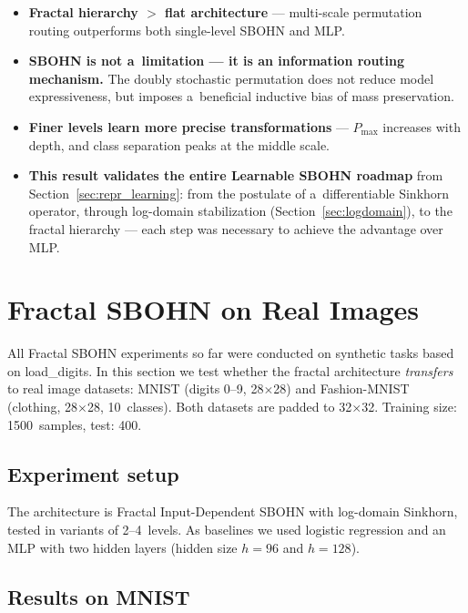 \documentclass[11pt,a4paper]{report}
\begin{document}
\begin{itemize}
    \item \textbf{Fractal hierarchy $>$ flat architecture} --- multi-scale permutation routing outperforms both single-level SBOHN and MLP.
    \item \textbf{SBOHN is not a~limitation --- it is an information routing mechanism.} The doubly stochastic permutation does not reduce model expressiveness, but imposes a~beneficial inductive bias of mass preservation.
    \item \textbf{Finer levels learn more precise transformations} --- $P_{\max}$ increases with depth, and class separation peaks at the middle scale.
    \item \textbf{This result validates the entire Learnable SBOHN roadmap} from Section~\ref{sec:repr_learning}: from the postulate of a~differentiable Sinkhorn operator, through log-domain stabilization (Section~\ref{sec:logdomain}), to the fractal hierarchy --- each step was necessary to achieve the advantage over MLP.
\end{itemize}


\clearpage

\section{Fractal SBOHN on Real Images}\label{sec:fractal_real}

All Fractal SBOHN experiments so far were conducted on synthetic tasks based on load\_digits.
In this section we test whether the fractal architecture \emph{transfers} to real image datasets:
MNIST (digits 0--9, 28$\times$28) and Fashion-MNIST (clothing, 28$\times$28, 10~classes).
Both datasets are padded to 32$\times$32. Training size: 1500~samples, test: 400.

\subsection{Experiment setup}

The architecture is Fractal Input-Dependent SBOHN with log-domain Sinkhorn, tested in variants
of 2--4~levels. As baselines we used logistic regression and an MLP with two hidden layers
(hidden size $h{=}96$ and $h{=}128$).

\subsection{Results on MNIST}
\end{document}
